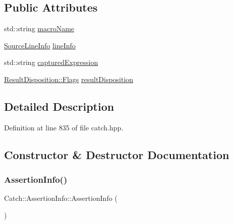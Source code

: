 \subsection*{Public Attributes}
\begin{DoxyCompactItemize}
\item 
std\+::string \hyperlink{struct_catch_1_1_assertion_info_ac2e59e8c89e00eb3390768f50d540b18}{macro\+Name}
\item 
\hyperlink{struct_catch_1_1_source_line_info}{Source\+Line\+Info} \hyperlink{struct_catch_1_1_assertion_info_a17bdbb404ba12658034f833be2f4c3e7}{line\+Info}
\item 
std\+::string \hyperlink{struct_catch_1_1_assertion_info_af7c1d3cbfa346e9a303030fa0ef0cb54}{captured\+Expression}
\item 
\hyperlink{struct_catch_1_1_result_disposition_a3396cad6e2259af326b3aae93e23e9d8}{Result\+Disposition\+::\+Flags} \hyperlink{struct_catch_1_1_assertion_info_a60353b3632ab2f827162f2b2d6911073}{result\+Disposition}
\end{DoxyCompactItemize}


\subsection{Detailed Description}


Definition at line 835 of file catch.\+hpp.



\subsection{Constructor \& Destructor Documentation}
\hypertarget{struct_catch_1_1_assertion_info_a15c29d306c86361f842a0351a6003b9f}{}\label{struct_catch_1_1_assertion_info_a15c29d306c86361f842a0351a6003b9f} 
\subsubsection{\texorpdfstring{Assertion\+Info()}{AssertionInfo()}\hspace{0.1cm}{\footnotesize\ttfamily [1/2]}}
{\footnotesize\ttfamily Catch\+::\+Assertion\+Info\+::\+Assertion\+Info (\begin{DoxyParamCaption}{ }\end{DoxyParamCaption})\hspace{0.3cm}{\ttfamily [inline]}}



